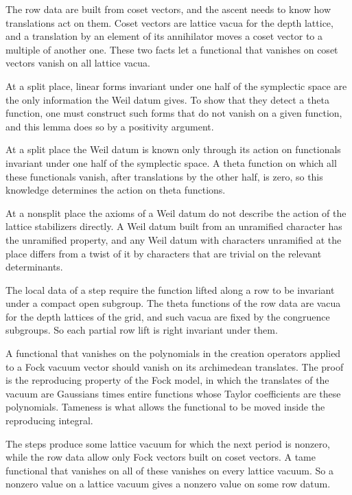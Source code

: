 The row data are built from coset vectors, and the ascent needs to know how
translations act on them. Coset vectors are lattice vacua for the depth
lattice, and a translation by an element of its annihilator moves a coset
vector to a multiple of another one. These two facts let a functional that
vanishes on coset vectors vanish on all lattice vacua.

At a split place, linear forms invariant under one half of the symplectic space
are the only information the Weil datum gives. To show that they detect a
theta function, one must construct such forms that do not vanish on a given
function, and this lemma does so by a positivity argument.

At a split place the Weil datum is known only through its action on
functionals invariant under one half of the symplectic space. A theta function
on which all these functionals vanish, after translations by the other half,
is zero, so this knowledge determines the action on theta functions.

At a nonsplit place the axioms of a Weil datum do not describe the action of
the lattice stabilizers directly. A Weil datum built from an unramified
character has the unramified property, and any Weil datum with characters
unramified at the place differs from a twist of it by characters that are
trivial on the relevant determinants.

The local data of a step require the function lifted along a row to be
invariant under a compact open subgroup. The theta functions of the row data
are vacua for the depth lattices of the grid, and such vacua are fixed by the
congruence subgroups. So each partial row lift is right invariant under them.

A functional that vanishes on the polynomials in the creation operators
applied to a Fock vacuum vector should vanish on its archimedean translates.
The proof is the reproducing property of the Fock model, in which the
translates of the vacuum are Gaussians times entire functions whose Taylor
coefficients are these polynomials. Tameness is what allows the functional to
be moved inside the reproducing integral.

The steps produce some lattice vacuum for which the next period is nonzero,
while the row data allow only Fock vectors built on coset vectors. A tame
functional that vanishes on all of these vanishes on every lattice vacuum. So a
nonzero value on a lattice vacuum gives a nonzero value on some row datum.

